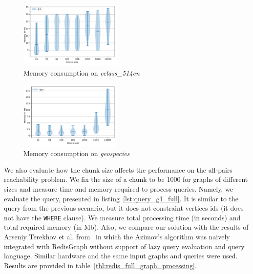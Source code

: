 \begin{figure}[h]
\centering
\includegraphics[width=0.45\textwidth]{data/raw_memory/eclass_514en.pdf}
\caption{Memory consumption on \textit{eclass\_514en}}
\label{fig:redis_memory_eclass}
\end{figure}

\begin{figure}[h]
\centering
\includegraphics[width=0.45\textwidth]{data/raw_memory/geospecies.pdf}
\caption{Memory consumption on \textit{geospecies}}
\label{fig:redis_memory_geospecies}
\end{figure}



We also evaluate how the chunk size affects the performance on the all-pairs reachability problem.
We fix the size of a chunk to be 1000 for graphs of different sizes and measure time and memory required to process queries.
Namely, we evaluate the query, presented in listing~\ref{lst:query_g1_full}.
It is similar to the query from the previous scenario, but it does not constraint  vertices ids (it does not have the \texttt{WHERE} clause).
We measure total processing time (in seconds) and total required memory (in Mb).
Also, we compare our solution with the results of Arseniy Terekhov et al. from~\cite{10.1145/3398682.3399163} in which the Azimov's algorithm was naively integrated with RedisGraph without support of lazy query evaluation and query language.
Similar hardware and the same input graphs and queries were used.
Results are provided in table~\ref{tbl:redis_full_graph_processing}.

